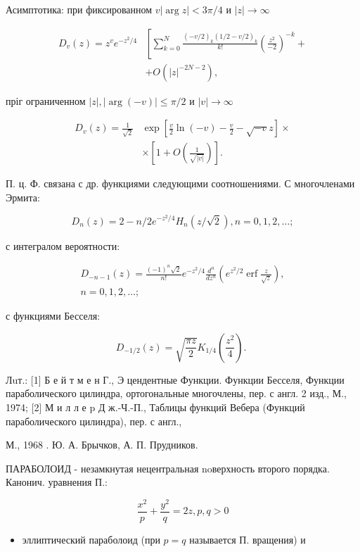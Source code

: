 \documentclass[10pt]{article}
\begin{document}
Асимптотика: при фиксированном $v|\arg z|<3 \pi / 4$ и $|z| \rightarrow \infty$

\[
\begin{aligned}
D_{v}(z)=z^{v} e^{-z^{2} / 4} & {\left[\sum_{k=0}^{N} \frac{(-v / 2)_{k}(1 / 2-v / 2)_{k}}{k !}\left(\frac{z^{2}}{-2}\right)^{-k}+\right.} \\
& +O\left(|z|^{-2 N-2}\right),
\end{aligned}
\]

пріг ограниченном $|z|,|\arg (-v)| \leqslant \pi / 2$ и $|v| \rightarrow \infty$

\[
\begin{aligned}
D_{v}(z)=\frac{1}{\sqrt{2}} & \exp \left[\frac{v}{2} \ln (-v)-\frac{v}{2}-\sqrt{-v} z\right] \times \\
& \times\left[1+O\left(\frac{1}{\sqrt{|v|}}\right)\right] .
\end{aligned}
\]

П. ц. Ф. связана с др. функциями следующими соотношениями. С многочленами Эрмита:

\[
D_{n}(z)=2-n / 2 e^{-z^{2} / 4} H_{n}(z / \sqrt{2}), n=0,1,2, \ldots ;
\]

с интегралом вероятности:

\[
\begin{gathered}
D_{-n-1}(z)=\frac{(-1)^{n} \sqrt{2}}{n !} e^{-z^{2} / 4} \frac{d^{n}}{d z^{n}}\left(e^{z^{2} / 2} \operatorname{erf} \frac{z}{\sqrt{z}}\right), \\
n=0,1,2, \ldots ;
\end{gathered}
\]

с функциями Бесселя:

\[
D_{-1 / 2}(z)=\sqrt{\frac{\pi z}{2}} K_{1 / 4}\left(\frac{z^{2}}{4}\right) \text {. }
\]

Лuт.: [1] Б е й т м е н Г., Э цендентные Функции. Функции Бесселя, Функции параболического цилиндра, ортогональные многочлены, пер. с англ. 2 изд., М., 1974; [2] М и л л е p Д ж.-Ч.-П., Таблицы функций Вебера (Функций параболического цилиндра), пер. с англ.,

М., 1968 . Ю. А. Брычков, А. П. Прудников.

ПАРАБОЛОИД - незамкнутая нецентральная noверхность второго порядка. Канонич. уравнения П.:

\[
\frac{x^{2}}{p}+\frac{y^{2}}{q}=2 z, p, q>0
\]

\begin{itemize}
  \item эллиптический параболоид (при $p=q$ называется П. вращения) и
\end{itemize}
\end{document}
